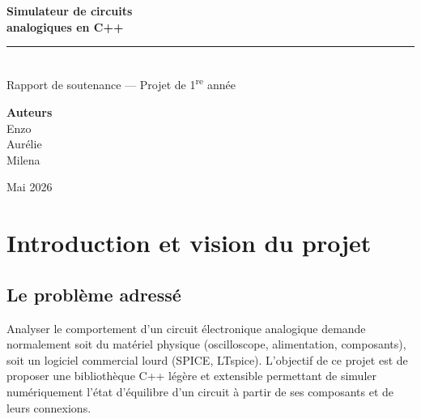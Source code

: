 \documentclass[12pt,a4paper]{article}
\begin{document}
\begin{titlepage}
  \pagecolor{crtblue}
  \color{white}
  \vspace*{3cm}

  \begin{center}
  

    {\fontsize{36}{40}\selectfont\bfseries Simulateur de circuits\\[6pt] analogiques en C++}\\[1.2cm]

    \textcolor{white!70}{\rule{10cm}{0.5pt}}\\[1.2cm]

    {\large Rapport de soutenance --- Projet de 1\textsuperscript{re} année}\\[2cm]

    \begin{tcolorbox}[
      colback=white!15, colframe=white!40,
      width=9cm, arc=4pt,
      boxrule=0.5pt,
      left=12pt, right=12pt, top=10pt, bottom=10pt
    ]
      \centering
      \textbf{Auteurs}\\[6pt]
      Enzo  \\ Aurélie \\ Milena \\[8pt]
      
    \end{tcolorbox}

    \vfill
    {\small Mai 2026}
  \end{center}
\end{titlepage}
\nopagecolor

\newpage
\tableofcontents
\newpage

\section{Introduction et vision du projet}

\subsection{Le problème adressé}

Analyser le comportement d'un circuit électronique analogique demande normalement soit
du matériel physique (oscilloscope, alimentation, composants), soit un logiciel commercial
lourd (SPICE, LTspice). L'objectif de ce projet est de proposer une bibliothèque C++ légère et 
extensible permettant de simuler numériquement l'état d'équilibre d'un circuit
à partir de ses composants et de leurs connexions.
\end{document}
